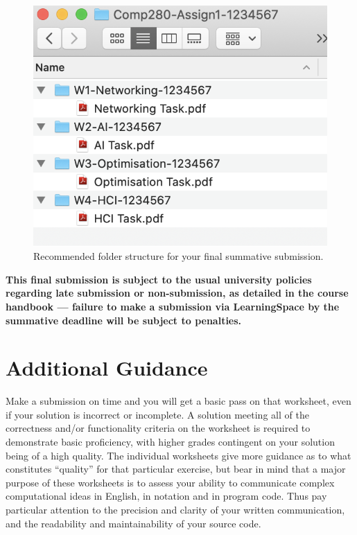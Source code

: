 \documentclass{../../fal_assignment}
\begin{document}
\begin{figure}
    \begin{center}
        \includegraphics[height=0.4\textheight]{folder_structure}
    \end{center}
    \caption{Recommended folder structure for your final summative submission.}
    \label{fig:folder_structure}
\end{figure}

\textbf{This final submission is subject to the usual university policies regarding late submission or non-submission,
as detailed in the course handbook --- failure to make a submission via LearningSpace by the summative deadline will
 be subject to penalties.}

\section*{Additional Guidance}

Make a submission on time and you will get a basic pass on that worksheet,
even if your solution is incorrect or incomplete.
A solution meeting all of the correctness and/or functionality criteria on the worksheet is required to demonstrate basic proficiency,
with higher grades contingent on your solution being of a high quality.
The individual worksheets give more guidance as to what constitutes ``quality'' for that particular exercise,
but bear in mind that a major purpose of these worksheets is to assess your ability to communicate
complex computational ideas in English, in notation and in program code.
Thus pay particular attention to the precision and clarity of your written communication,
and the readability and maintainability of your source code.
\end{document}
